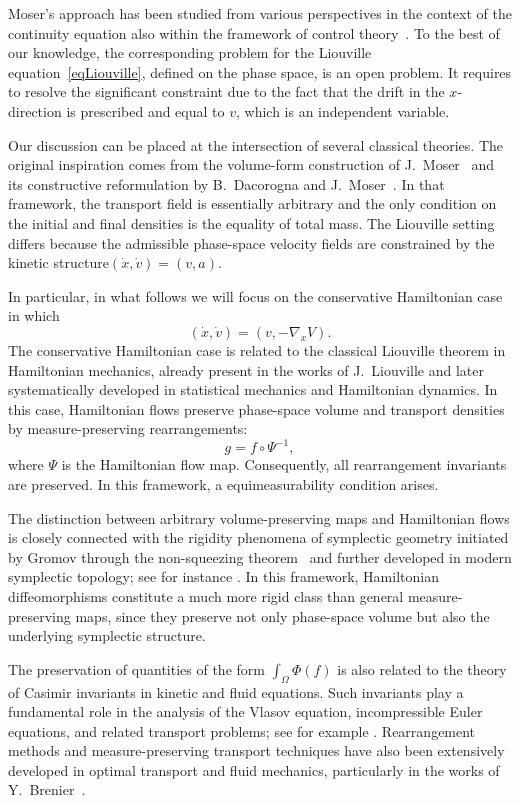 \documentclass[11pt]{article}
\begin{document}
Moser’s approach has been studied 
from various perspectives in the context of the continuity equation also
within the framework of control theory~\cite{AC09,brockett2012notes,AV25}. To the best of our knowledge, 
the corresponding problem for the Liouville equation~\eqref{eqLiouville}, defined on the 
phase space, is an open problem. It requires to resolve the significant 
constraint due to the fact that the drift in the $x$-direction is prescribed and 
equal to $v$, which is an independent variable. 


\medskip

Our discussion can be placed at the intersection of several classical theories. 
The original inspiration comes from the volume-form construction of
J.~Moser~\cite{moser65} and its constructive reformulation by
B.~Dacorogna and J.~Moser~\cite{dacorognamoser}. In that framework, the
transport field is essentially arbitrary and the only condition on the initial and final densities is the
equality of total mass. The  Liouville setting differs because the
admissible phase-space velocity fields are constrained by the kinetic structure$
(\dot x,\dot v)=(v,a).$


In particular, in what follows we will focus on the conservative Hamiltonian case in which
\[
(\dot x,\dot v)=(v,-\nabla_x V).
\]
The conservative Hamiltonian case is related to the classical Liouville theorem
in Hamiltonian mechanics, already present in the works of
J.~Liouville and later systematically developed in statistical mechanics and
Hamiltonian dynamics. In this case, Hamiltonian flows preserve phase-space
volume and transport densities by measure-preserving rearrangements:
\[
g=f\circ\Psi^{-1},
\]
where \(\Psi\) is the Hamiltonian flow map. Consequently, all rearrangement
invariants are preserved. In this framework, a equimeasurability condition arises.

The distinction between arbitrary volume-preserving maps and Hamiltonian flows
is closely connected with the rigidity phenomena of symplectic geometry
initiated by Gromov through the non-squeezing theorem~\cite{Gromov1985} and
further developed in modern symplectic topology; see for instance
\cite{Hoferzehnder1994,Mcdsal2017}. In this framework, Hamiltonian diffeomorphisms
constitute a much more rigid class than general measure-preserving maps,
since they preserve not only phase-space volume but also the underlying
symplectic structure.

The preservation of quantities of the form $\int_{\Omega}\Phi(f)$ 
is also related to the theory of Casimir invariants in kinetic and fluid
equations. Such invariants play a fundamental role in the analysis of the
Vlasov equation, incompressible Euler equations, and related transport
problems; see for example \cite{MarsdenWeinstein1983,Morrison1980}. Rearrangement
methods and measure-preserving transport techniques have also been extensively
developed in optimal transport and fluid mechanics, particularly in the works
of Y.~Brenier~\cite{Brenier1989,Brenier1991,Brenier2003}.
\end{document}
